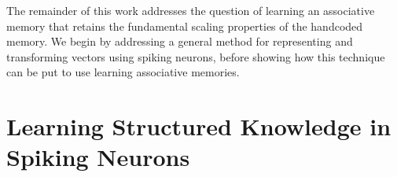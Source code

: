 \documentclass[10pt,letterpaper]{article}
\begin{document}

The remainder of this work addresses the question of learning an associative memory that retains the fundamental scaling properties of the handcoded memory. We begin by addressing a general method for representing and transforming vectors using spiking neurons, before showing how this technique can be put to use learning associative memories.

\section{Learning Structured Knowledge in Spiking Neurons}
\end{document}
